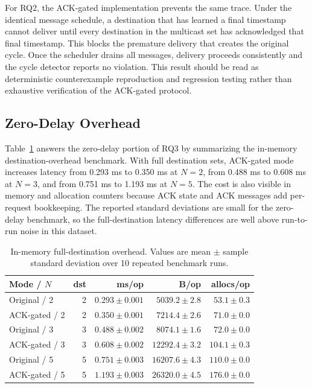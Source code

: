 \documentclass[conference]{IEEEtran}
\begin{document}
For RQ2, the ACK-gated implementation prevents the same trace. Under the identical message schedule, a destination that has learned a final timestamp cannot deliver until every destination in the multicast set has acknowledged that final timestamp. This blocks the premature delivery that creates the original cycle. Once the scheduler drains all messages, delivery proceeds consistently and the cycle detector reports no violation. This result should be read as deterministic counterexample reproduction and regression testing rather than exhaustive verification of the ACK-gated protocol.

\subsection{Zero-Delay Overhead}

Table~\ref{tab:inmemory} answers the zero-delay portion of RQ3 by summarizing the in-memory destination-overhead benchmark. With full destination sets, ACK-gated mode increases latency from 0.293 ms to 0.350 ms at $N=2$, from 0.488 ms to 0.608 ms at $N=3$, and from 0.751 ms to 1.193 ms at $N=5$. The cost is also visible in memory and allocation counters because ACK state and ACK messages add per-request bookkeeping. The reported standard deviations are small for the zero-delay benchmark, so the full-destination latency differences are well above run-to-run noise in this dataset.

\begin{table}[t]
\centering
\caption{In-memory full-destination overhead. Values are mean $\pm$ sample standard deviation over 10 repeated benchmark runs.}
\label{tab:inmemory}
\begin{tabular}{lrrrr}
\toprule
Mode / $N$ & dst & ms/op & B/op & allocs/op \\
\midrule
Original / 2 & 2 & $0.293 \pm 0.001$ & $5039.2 \pm 2.8$ & $53.1 \pm 0.3$ \\
ACK-gated / 2 & 2 & $0.350 \pm 0.001$ & $7214.4 \pm 2.6$ & $71.0 \pm 0.0$ \\
Original / 3 & 3 & $0.488 \pm 0.002$ & $8074.1 \pm 1.6$ & $72.0 \pm 0.0$ \\
ACK-gated / 3 & 3 & $0.608 \pm 0.002$ & $12292.4 \pm 3.2$ & $104.1 \pm 0.3$ \\
Original / 5 & 5 & $0.751 \pm 0.003$ & $16207.6 \pm 4.3$ & $110.0 \pm 0.0$ \\
ACK-gated / 5 & 5 & $1.193 \pm 0.003$ & $26320.0 \pm 4.5$ & $176.0 \pm 0.0$ \\
\bottomrule
\end{tabular}
\end{table}
\end{document}
